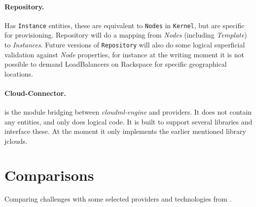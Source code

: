 \paragraph{Repository.} Has \texttt{Instance} entities, these are equivalent to \texttt{Nodes} in \texttt{Kernel},
but are specific for provisioning. Repository will do a mapping from \emph{Nodes} (including \emph{Template})
to \emph{Instances}. Future versions of \texttt{Repository} will also do some logical superficial validation
against \emph{Node} properties, for instance at the writing moment it is not possible to 
demand LoadBalancers on Rackspace for specific geographical locations.

\paragraph{Cloud-Connector.} is the module bridging between \emph{cloudml-engine} and providers.
It does not contain any entities, and only does logical code. 
It is built to support several libraries and interface these. At the moment it only implements the earlier
mentioned library jclouds.

\section{Comparisons}

Comparing challenges with some selected providers and technologies from .



